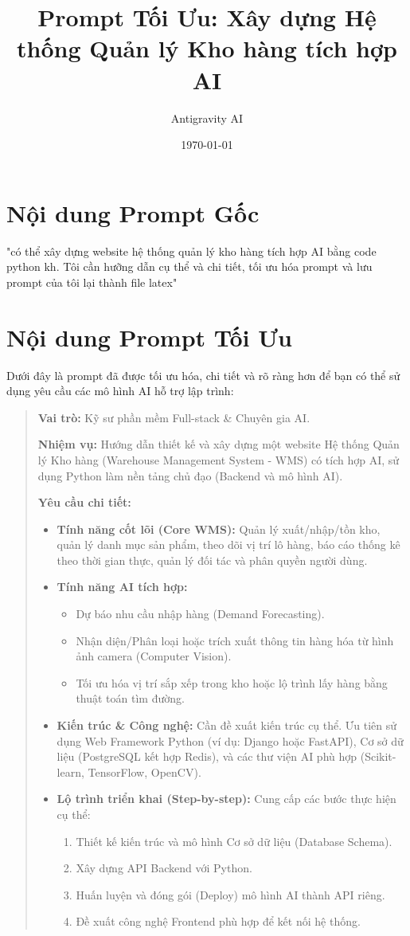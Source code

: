\documentclass[12pt,a4paper]{article}
\title{Prompt Tối Ưu: Xây dựng Hệ thống Quản lý Kho hàng tích hợp AI}
\author{Antigravity AI}
\date{\today}
\begin{document}
\maketitle

\section*{Nội dung Prompt Gốc}
"có thể xây dựng website hệ thống quản lý kho hàng tích hợp AI bằng code python kh. Tôi cần hưỡng dẫn cụ thể và chi tiết, tối ưu hóa prompt và lưu prompt của tôi lại thành file latex"

\section*{Nội dung Prompt Tối Ưu}
Dưới đây là prompt đã được tối ưu hóa, chi tiết và rõ ràng hơn để bạn có thể sử dụng yêu cầu các mô hình AI hỗ trợ lập trình:

\begin{quote}
\textbf{Vai trò:} Kỹ sư phần mềm Full-stack \& Chuyên gia AI.

\textbf{Nhiệm vụ:} Hướng dẫn thiết kế và xây dựng một website Hệ thống Quản lý Kho hàng (Warehouse Management System - WMS) có tích hợp AI, sử dụng Python làm nền tảng chủ đạo (Backend và mô hình AI).

\textbf{Yêu cầu chi tiết:}
\begin{itemize}
    \item \textbf{Tính năng cốt lõi (Core WMS):} Quản lý xuất/nhập/tồn kho, quản lý danh mục sản phẩm, theo dõi vị trí lô hàng, báo cáo thống kê theo thời gian thực, quản lý đối tác và phân quyền người dùng.
    \item \textbf{Tính năng AI tích hợp:} 
    \begin{itemize}
        \item Dự báo nhu cầu nhập hàng (Demand Forecasting).
        \item Nhận diện/Phân loại hoặc trích xuất thông tin hàng hóa từ hình ảnh camera (Computer Vision).
        \item Tối ưu hóa vị trí sắp xếp trong kho hoặc lộ trình lấy hàng bằng thuật toán tìm đường.
    \end{itemize}
    \item \textbf{Kiến trúc \& Công nghệ:} Cần đề xuất kiến trúc cụ thể. Ưu tiên sử dụng Web Framework Python (ví dụ: Django hoặc FastAPI), Cơ sở dữ liệu (PostgreSQL kết hợp Redis), và các thư viện AI phù hợp (Scikit-learn, TensorFlow, OpenCV).
    \item \textbf{Lộ trình triển khai (Step-by-step):} Cung cấp các bước thực hiện cụ thể:
    \begin{enumerate}
        \item Thiết kế kiến trúc và mô hình Cơ sở dữ liệu (Database Schema).
        \item Xây dựng API Backend với Python.
        \item Huấn luyện và đóng gói (Deploy) mô hình AI thành API riêng.
        \item Đề xuất công nghệ Frontend phù hợp để kết nối hệ thống.
    \end{enumerate}
\end{itemize}
\end{quote}
\end{document}
